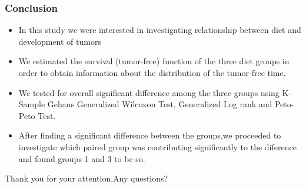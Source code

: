 \documentclass[hyperref={pdfpagelabels=false}]{beamer}
\begin{document}
\begin{frame}
\frametitle{Conclusion}
\begin{itemize}
\item In this study we were interested in investigating relationship between diet and development of tumors
\item We  estimated the survival (tumor-free) function  of the three diet groups in order to obtain information about the distribution of the tumor-free time.
\item We tested for overall significant difference among the three groups using K-Sample Gehans Generalized Wilcoxon Test, Generalized Log rank and Peto-Peto Test.
\item After finding a significant difference between the groups,we proceeded to investigate which paired group was contributing  significantly to the diference and found groups 1 and 3 to be so.

\end{itemize}



\end{frame}







\begin{frame}

\begin{block}{}
Thank you for your attention.Any questions?
\end{block}



\end{frame}
\begin{frame}
\hyperlink{frame6}{}	
\end{frame}
\end{document}
